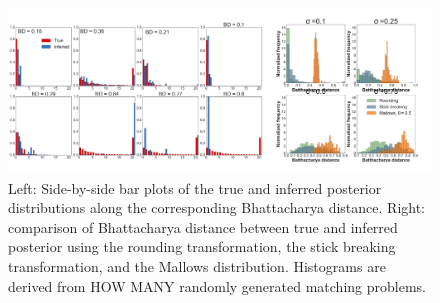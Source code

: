  \begin{figure}[t] 
   \centering
   \includegraphics[width=1.0\textwidth]{../figures/figure5.pdf}
   \caption{Left: Side-by-side bar plots of the true and inferred
     posterior distributions along the corresponding Bhattacharya distance.
     Right: comparison of Bhattacharya distance between true and inferred
   posterior using the rounding transformation, the stick breaking transformation, and the Mallows distribution.  Histograms are derived from HOW MANY randomly generated matching problems.  }
\label{fig:VAE}
\end{figure}

\label{sec:synthetic}


